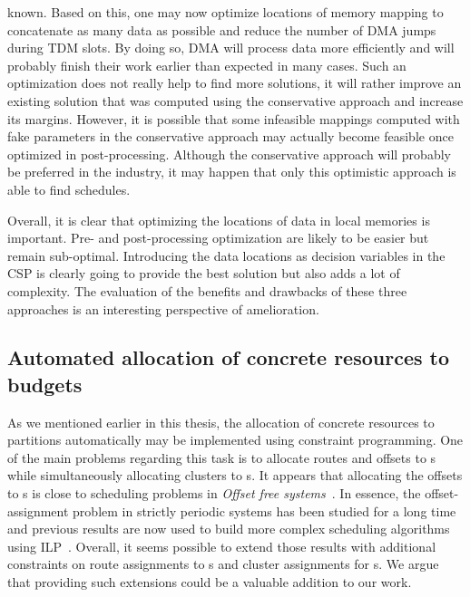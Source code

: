 \documentclass[main.tex]{subfiles}
\begin{document}
\begin{enumerate}
        known.  Based on this, one may now optimize locations of memory mapping
        to concatenate as many data as possible and reduce the number of DMA
        jumps during TDM slots. By doing so, DMA will process data more
        efficiently and will probably finish their work earlier than expected
        in many cases. Such an optimization does not really help to find more
        solutions, it will rather improve an existing solution that was
        computed using the conservative approach and increase its margins.
        However, it is possible that some infeasible mappings computed with
        fake parameters in the conservative approach may actually become
        feasible once optimized in post-processing. Although the conservative
        approach will probably be preferred in the industry, it may happen that
        only this optimistic approach is able to find schedules.
\end{enumerate}

Overall, it is clear that optimizing the locations of data in local memories is
important. Pre- and post-processing optimization are likely to be easier but
remain sub-optimal. Introducing the data locations as decision variables in the
CSP is clearly going to provide the best solution but also adds a lot of
complexity. The evaluation of the benefits and drawbacks of these three
approaches is an interesting perspective of amelioration.

\subsection{Automated allocation of concrete resources to budgets} As we
mentioned earlier in this thesis, the allocation of concrete resources to
partitions automatically may be implemented using constraint programming. One
of the main problems regarding this task is to allocate routes and offsets to
\PC{}s while simultaneously allocating clusters to \PN{}s. It appears that
allocating the offsets to \PC{}s is close to scheduling problems in
\emph{Offset free systems}~\cite{Goossens03}. In essence, the offset-assignment
problem in strictly periodic systems has been studied for a long
time~\cite{Korst91} and previous results are now used to build more complex
scheduling algorithms using ILP~\cite{Kermia09,Alsheikh11}. Overall, it seems
possible to extend those results with additional constraints on route
assignments to \PC{}s and cluster assignments for \PN{}s. We argue that
providing such extensions could be a valuable addition to our work.
\end{document}
